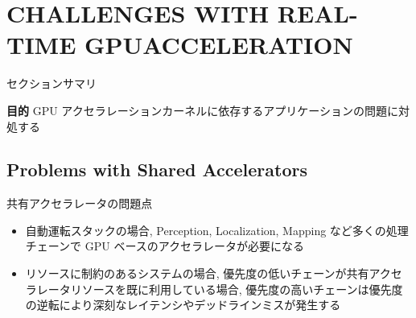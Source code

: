 
\section{CHALLENGES WITH REAL-TIME GPUACCELERATION}
\label{sec: challenges with real-time gpuacceleration}

\begin{frame}{セクションサマリ}
    \begin{itembox}[l]{\textbf{目的}}
        GPU アクセラレーションカーネルに依存するアプリケーションの問題に対処する
    \end{itembox}
\end{frame}



\subsection{Problems with Shared Accelerators}
\label{ssec: problems with shared accelerators}

\begin{frame}{共有アクセラレータの問題点}
    \begin{itemize}
        \item 自動運転スタックの場合, Perception, Localization, Mapping など多くの処理チェーンで GPU ベースのアクセラレータが必要になる
        \item リソースに制約のあるシステムの場合, 優先度の低いチェーンが共有アクセラレータリソースを既に利用している場合, 優先度の高いチェーンは優先度の逆転により深刻なレイテンシやデッドラインミスが発生する
    \end{itemize}
\end{frame}


